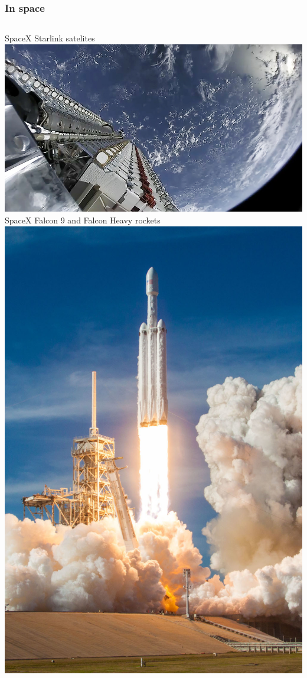 \begin{frame}
\frametitle{In space}
  \begin{columns}
  \scriptsize
  SpaceX Starlink satelites\\
  \includegraphics[height=0.3\textheight]{slides/sysdev-intro/starlink.jpg}\\
  SpaceX Falcon 9 and Falcon Heavy rockets\\
  \includegraphics[height=0.3\textheight]{slides/sysdev-intro/falcon-heavy.jpg}\\

\end{columns}
\end{frame}
